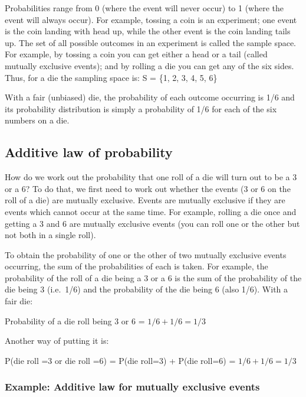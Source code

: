 \documentclass[
]{memoir}
\begin{document}
Probabilities range from 0 (where the event will never occur) to 1 (where the event will always occur). For example, tossing a coin is an experiment; one event is the coin landing with head up, while the other event is the coin landing tails up. The set of all possible outcomes in an experiment is called the sample space. For example, by tossing a coin you can get either a head or a tail (called mutually exclusive events); and by rolling a die you can get any of the six sides. Thus, for a die the sampling space is: S = \{1, 2, 3, 4, 5, 6\}

With a fair (unbiased) die, the probability of each outcome occurring is 1/6 and its probability distribution is simply a probability of 1/6 for each of the six numbers on a die.

\hypertarget{additive-law-of-probability}{%
\subsection{Additive law of probability}\label{additive-law-of-probability}}

How do we work out the probability that one roll of a die will turn out to be a 3 or a 6? To do that, we first need to work out whether the events (3 or 6 on the roll of a die) are mutually exclusive. Events are mutually exclusive if they are events which cannot occur at the same time. For example, rolling a die once and getting a 3 and 6 are mutually exclusive events (you can roll one or the other but not both in a single roll).

To obtain the probability of one or the other of two mutually exclusive events occurring, the sum of the probabilities of each is taken. For example, the probability of the roll of a die being a 3 or a 6 is the sum of the probability of the die being 3 (i.e.~1/6) and the probability of the die being 6 (also 1/6). With a fair die:

Probability of a die roll being 3 or 6 = \(1/6 + 1/6 = 1/3\)

Another way of putting it is:

P(die roll =3 or die roll =6) = P(die roll=3) + P(die roll=6) = \(1/6 + 1/6 = 1/3\)

\hypertarget{example-additive-law-for-mutually-exclusive-events}{%
\subsubsection*{Example: Additive law for mutually exclusive events}\label{example-additive-law-for-mutually-exclusive-events}}
\end{document}
